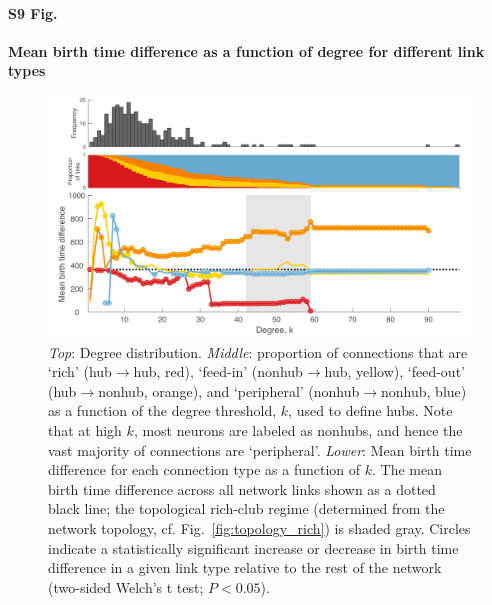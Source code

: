 \documentclass[10pt,letterpaper]{article}
\begin{document}
\paragraph*{S9 Fig.}
{\bf Mean birth time difference as a function of degree for different link types}
\begin{figure}[!h]
\label{BirthTimesk}
\centering
    \includegraphics[width=1\textwidth]{MeanBirthTimes.pdf}
    \caption{\emph{Top}: Degree distribution.
\emph{Middle}: proportion of connections that are `rich' (hub$\rightarrow$hub, red), `feed-in' (nonhub$\rightarrow$hub, yellow), `feed-out' (hub$\rightarrow$nonhub, orange), and `peripheral' (nonhub$\rightarrow$nonhub, blue) as a function of the degree threshold, $k$, used to define hubs.
Note that at high $k$, most neurons are labeled as nonhubs, and hence the vast majority of connections are `peripheral'.
\emph{Lower}: Mean birth time difference for each connection type as a function of $k$.
The mean birth time difference across all network links shown as a dotted black line; the topological rich-club regime (determined from the network topology, cf. Fig.~\ref{fig:topology_rich}) is shaded gray.
Circles indicate a statistically significant increase or decrease in birth time difference in a given link type relative to the rest of the network (two-sided Welch’s t test; $P < 0.05$).
}
\end{figure}

\end{document}
